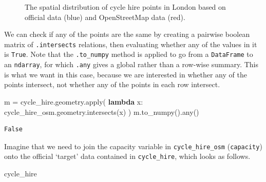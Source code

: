 \documentclass[
  letterpaper,
]{krantz}
\newenvironment{Shaded}{\begin{snugshade}}{\end{snugshade}}
\newcommand{\BuiltInTok}[1]{\textcolor[rgb]{0.00,0.23,0.31}{#1}}
\newcommand{\KeywordTok}[1]{\textcolor[rgb]{0.00,0.23,0.31}{\textbf{#1}}}
\newcommand{\NormalTok}[1]{\textcolor[rgb]{0.00,0.23,0.31}{#1}}
\newcommand{\OperatorTok}[1]{\textcolor[rgb]{0.37,0.37,0.37}{#1}}
\begin{document}
\begin{figure}[H]


\caption{\label{fig-cycle-hire}The spatial distribution of cycle hire
points in London based on official data (blue) and OpenStreetMap data
(red).}

\end{figure}%

We can check if any of the points are the same by creating a pairwise
boolean matrix of \texttt{.intersects} relations, then evaluating
whether any of the values in it is \texttt{True}. Note that the
\texttt{.to\_numpy} method is applied to go from a \texttt{DataFrame} to
an \texttt{ndarray}, for which \texttt{.any} gives a global rather than
a row-wise summary. This is what we want in this case, because we are
interested in whether any of the points intersect, not whether any of
the points in each row intersect.

\begin{Shaded}
\begin{Highlighting}[]
\NormalTok{m }\OperatorTok{=}\NormalTok{ cycle\_hire.geometry.}\BuiltInTok{apply}\NormalTok{(}
  \KeywordTok{lambda}\NormalTok{ x: cycle\_hire\_osm.geometry.intersects(x)}
\NormalTok{)}
\NormalTok{m.to\_numpy().}\BuiltInTok{any}\NormalTok{()}
\end{Highlighting}
\end{Shaded}

\begin{verbatim}
False
\end{verbatim}

Imagine that we need to join the capacity variable in
\texttt{cycle\_hire\_osm}
(\texttt{\textquotesingle{}capacity\textquotesingle{}}) onto the
official `target' data contained in \texttt{cycle\_hire}, which looks as
follows.

\begin{Shaded}
\begin{Highlighting}[]
\NormalTok{cycle\_hire}
\end{Highlighting}
\end{Shaded}
\end{document}
